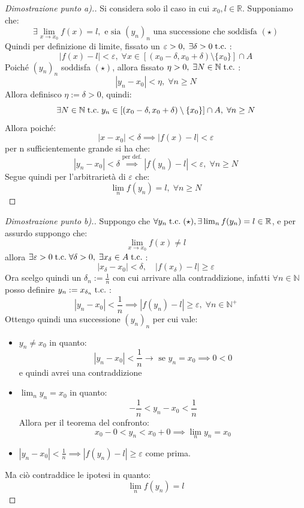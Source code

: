 \documentclass[a4paper,12pt,openright]{book}
\begin{document}
	\begin{proof}[Dimostrazione punto a).]
		Si considera solo il caso in cui $x_0, l \in \mathbb{R}$. Supponiamo che:
		\[\exists \lim_{x \rightarrow x_0} f(x) = l, \text{ e sia } (y_n)_n \text{ una successione che soddisfa } (\star)\] 
		Quindi per definizione di limite, fissato un $\varepsilon > 0, \; \exists \delta > 0 \;\text{t.c.}\;$:
		\[|f(x) - l| < \varepsilon, \; \forall x \in [(x_0 - \delta, x_0 + \delta) \setminus \{ x_0 \}]\cap A\]
		Poiché $(y_n)_n$ soddisfa $(\star)$, allora fissato $\eta > 0, \; \exists N \in \mathbb{N} \;\text{t.c.}\;$:
		\[|y_n - x_0| < \eta, \; \forall n \geq N\]
		Allora definisco $\eta := \delta > 0$, quindi:
		\[\exists N \in \mathbb{N} \;\text{t.c.}\; y_n \in [(x_0 - \delta, x_0 + \delta) \setminus \{x_0\}] \cap A, \; \forall n \geq N\]
		Allora poiché:
		\[|x - x_0| < \delta \implies |f(x) - l| < \varepsilon\]
		per n sufficientemente grande si ha che:
		\[|y_n - x_0| < \delta \overset{\text{per def.}}{\implies} |f(y_n) - l| < \varepsilon, \; \forall n \geq N\]
		Segue quindi per l'arbitrarietà di $\varepsilon$ che:
		\[\lim_{n} f(y_n) = l, \; \forall n \geq N\]
	\end{proof}
	
	\newpage
	
	\begin{proof}[Dimostrazione punto b).]
		Suppongo che $\forall y_n \;\text{t.c.}\; (\star), \exists \lim_{n} f(y_n) = l \in \mathbb{R}$, e per assurdo suppongo che:
		\[\lim_{x \rightarrow x_0} f(x) \not = l\]
		allora $\exists \varepsilon > 0 \;\text{t.c.}\; \forall \delta > 0, \; \exists x_\delta \in A \;\text{t.c.}\;$:
		\[|x_\delta - x_0| < \delta, \quad |f(x_\delta) - l| \geq \varepsilon\]
		Ora scelgo quindi un $\delta_n := \frac{1}{n}$ con cui arrivare alla contraddizione, infatti $\forall n \in \mathbb{N}$ posso definire $y_n := x_{\delta_n} \;\text{t.c.}\;$:
		\[|y_n - x_0| < \frac{1}{n} \implies |f(y_n) - l| \geq \varepsilon, \; \forall n \in \mathbb{N}^+\]
		Ottengo quindi una successione $(y_n)_n$ per cui vale:
		\begin{itemize}
			\item $y_n \not = x_0$ in quanto:
			\[|y_n - x_0| < \frac{1}{n} \rightarrow \text{ se } y_n = x_0 \implies 0 < 0\]
			e quindi avrei una contraddizione
			\item $\lim_{n} y_n = x_0$ in quanto:
			\[- \frac{1}{n} < y_n - x_0 < \frac{1}{n}\] 
			Allora per il teorema del confronto:
			\[x_0 - 0 < y_n < x_0 + 0 \implies \lim_{n} y_n = x_0\]
			\item $|y_n - x_0| < \frac{1}{n} \implies |f(y_n) - l| \geq \varepsilon$ come prima.
		\end{itemize} 
		Ma ciò contraddice le ipotesi in quanto:
		\[\lim_{n} f(y_n) = l\]
	\end{proof}
	
\end{document}

